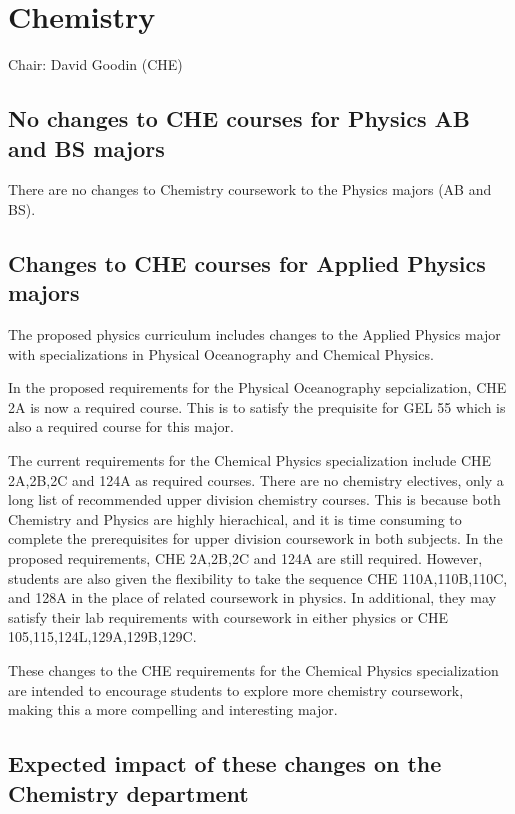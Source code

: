 \documentclass[12pt]{article}
\begin{document}
\newpage
\section{Chemistry}
Chair: David Goodin (CHE)

\subsection{No changes to CHE courses for Physics AB and BS majors}

There are no changes to Chemistry coursework to the Physics majors (AB
and BS).

\subsection{Changes to CHE courses for Applied Physics majors}

The proposed physics curriculum includes changes to the Applied
Physics major with specializations in Physical Oceanography and Chemical Physics.

In the proposed requirements for the Physical Oceanography
sepcialization, CHE 2A is now a required course.  This is to satisfy
the prequisite for GEL 55 which is also a required course for this
major.

The current requirements for the Chemical Physics specialization
include CHE 2A,2B,2C and 124A as required courses.  There are no
chemistry electives, only a long list of recommended upper division
chemistry courses.  This is because both Chemistry and Physics are
highly hierachical, and it is time consuming to complete the
prerequisites for upper division coursework in both subjects.  In the
proposed requirements, CHE 2A,2B,2C and 124A are still required.
However, students are also given the flexibility to take the sequence
CHE 110A,110B,110C, and 128A in the place of related coursework in
physics.  In additional, they may satisfy their lab requirements with
coursework in either physics or CHE 105,115,124L,129A,129B,129C.

These changes to the CHE requirements for the Chemical Physics
specialization are intended to encourage students to explore more
chemistry coursework, making this a more compelling and interesting
major.

\subsection{Expected impact of these changes on the Chemistry department}
\end{document}
